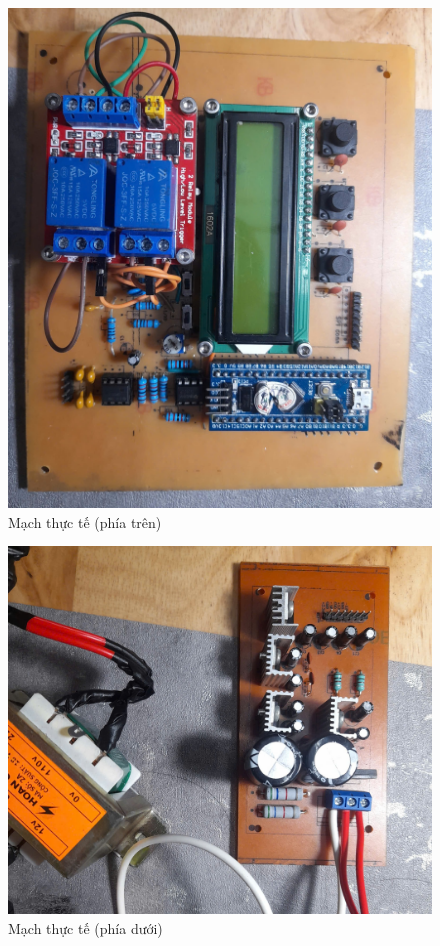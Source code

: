 	
		\begin{figure}[H]
			\includegraphics[width=\linewidth]{./picture/z6140688059060_129223f837543baa337e8804f1ab6d0e.jpg}
			\centering
			\caption{Mạch thực tế (phía trên)}
		\end{figure}
		
		\begin{figure}[H]
			\includegraphics[width=\linewidth]{./picture/z6140688059187_549b6f11830970f120cc8764fab2aaa8.jpg}
			\centering
			\caption{Mạch thực tế (phía dưới)}
		\end{figure}
		
